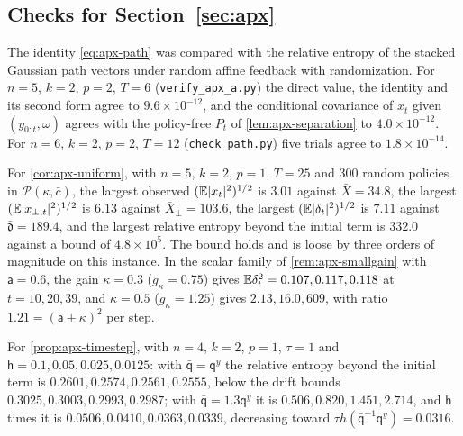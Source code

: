\subsection{Checks for \texorpdfstring{Section~\ref{sec:apx}}{approximate meta-agents}}\label{chk:apx}


\begin{numcheck}\label{chk:apx-path}
The identity \cref{eq:apx-path} was compared with the relative entropy of the stacked Gaussian path vectors under random affine feedback with randomization. For $n=5$, $k=2$, $p=2$, $T=6$ (\texttt{verify\_apx\_a.py}) the direct value, the identity and its second form agree to $9.6\times10^{-12}$, and the conditional covariance of $x_t$ given $(y_{0:t},\omega)$ agrees with the policy-free $P_t$ of \cref{lem:apx-separation} to $4.0\times10^{-12}$. For $n=6$, $k=2$, $p=2$, $T=12$ (\texttt{check\_path.py}) five trials agree to $1.8\times10^{-14}$.

For \cref{cor:apx-uniform}, with $n=5$, $k=2$, $p=1$, $T=25$ and $300$ random policies in $\mathcal P(\kappa,\bar c)$, the largest observed $(\mathbb{E}\lvert x_t\rvert^2)^{1/2}$ is $3.01$ against $\bar X=34.8$, the largest $(\mathbb{E}\lvert x_{\perp,t}\rvert^2)^{1/2}$ is $6.13$ against $\bar X_\perp=103.6$, the largest $(\mathbb{E}\lvert\delta_t\rvert^2)^{1/2}$ is $7.11$ against $\bar{\mathfrak d}=189.4$, and the largest relative entropy beyond the initial term is $332.0$ against a bound of $4.8\times10^5$. The bound holds and is loose by three orders of magnitude on this instance. In the scalar family of \cref{rem:apx-smallgain} with $\mathsf a=0.6$, the gain $\kappa=0.3$ ($g_\kappa=0.75$) gives $\mathbb{E}\delta_t^2=0.107,0.117,0.118$ at $t=10,20,39$, and $\kappa=0.5$ ($g_\kappa=1.25$) gives $2.13,16.0,609$, with ratio $1.21=(\mathsf a+\kappa)^2$ per step.

For \cref{prop:apx-timestep}, with $n=4$, $k=2$, $p=1$, $\tau=1$ and $\mathsf h=0.1,0.05,0.025,0.0125$: with $\bar{\mathsf q}=\mathsf q^y$ the relative entropy beyond the initial term is $0.2601,0.2574,0.2561,0.2555$, below the drift bounds $0.3025,0.3003,0.2993,0.2987$; with $\bar{\mathsf q}=1.3\mathsf q^y$ it is $0.506,0.820,1.451,2.714$, and $\mathsf h$ times it is $0.0506,0.0410,0.0363,0.0339$, decreasing toward $\tau h(\bar{\mathsf q}^{-1}\mathsf q^y)=0.0316$.
\end{numcheck}

